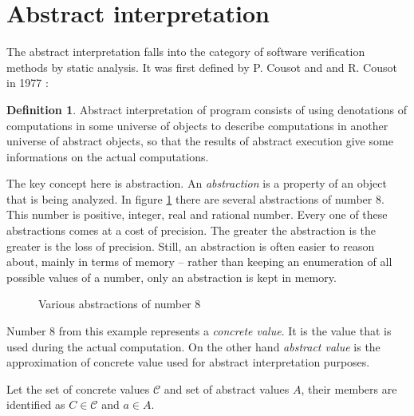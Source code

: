 \documentclass[12pt,final,oneside]{fithesis2}
\theoremstyle{definition}
\newtheorem{definition}{Definition}
\begin{document}
\section{Abstract interpretation}
\label{sec:abstractinterpretation}

The abstract interpretation falls into the category of software
verification methods by static analysis. It was first defined by P. Cousot
and and R. Cousot in 1977 \cite{CousotCousot77-1}:

\begin{definition}
Abstract interpretation of program consists of using denotations of
computations in some universe of objects to describe computations in
another universe of abstract objects, so that the results of abstract
execution give some informations on the actual computations.
\end{definition}

The key concept here is abstraction. An \textit{abstraction} is a property
of an object that is being analyzed. In figure \ref{fig:abstraction}
there are several abstractions of number 8. This number is positive,
integer, real and rational number. Every one of these abstractions comes
at a cost of precision. The greater the abstraction is the greater is the
loss of precision. Still, an abstraction is often easier to reason about,
mainly in terms of memory -- rather than keeping an enumeration of all
possible values of a number, only an abstraction is kept in memory.

\begin{figure}[ht]
\centering
{}
\caption{Various abstractions of number 8}
\label{fig:abstraction}
\end{figure}

Number 8 from this example represents a \textit{concrete value}. It is
the value that is used during the actual computation. On the other hand
\textit{abstract value} is the approximation of concrete value used for
abstract interpretation purposes.

Let the set of concrete values $\mathcal{C}$ and set of abstract values $A$,
their members are identified as $C \in \mathcal{C}$ and $a \in A$.
\end{document}
